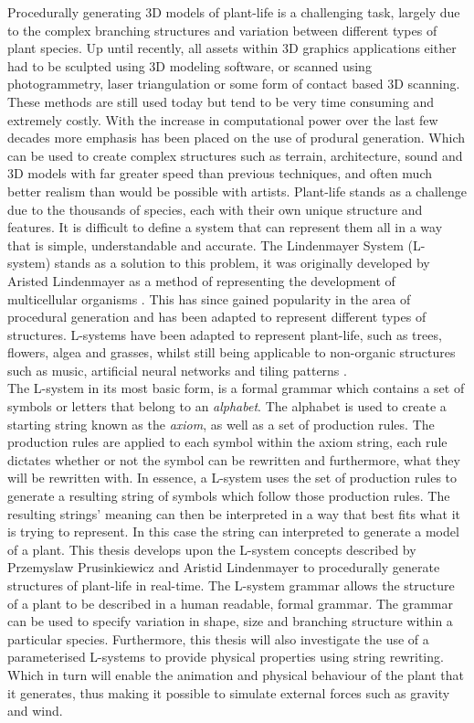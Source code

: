 
\lettrine[lines=3]{P}{}rocedurally generating 3D models of plant-life is a challenging task, largely due to the complex branching structures and variation between different types of plant species. Up until recently, all assets within 3D graphics applications either had to be sculpted using 3D modeling software, or scanned using photogrammetry, laser triangulation or some form of contact based 3D scanning. These methods are still used today but tend to be very time consuming and extremely costly. With the increase in computational power over the last few decades more emphasis has been placed on the use of produral generation. Which can be used to create complex structures such as terrain, architecture, sound and 3D models with far greater speed than previous techniques, and often much better realism than would be possible with artists. Plant-life stands as a challenge due to the thousands of species, each with their own unique structure and features. It is difficult to define a system that can represent them all in a way that is simple, understandable and accurate. The Lindenmayer System (L-system) stands as a solution to this problem, it was originally developed by Aristed Lindenmayer as a method of representing the development of multicellular organisms \cite{lindenmayer1968mathematical}. This has since gained popularity in the area of procedural generation and has been adapted to represent different types of structures. L-systems have been adapted to represent plant-life, such as trees, flowers, algea and grasses, whilst still being applicable to non-organic structures such as music, artificial neural networks and tiling patterns \cite{Prusinkiewicz1989}.\\
 
The L-system in its most basic form, is a formal grammar which contains a set of symbols or letters that belong to an \textit{alphabet}. The alphabet is used to create a starting string known as the \textit{axiom}, as well as a set of production rules. The production rules are applied to each symbol within the axiom string, each rule dictates whether or not the symbol can be rewritten and furthermore, what they will be rewritten with. In essence, a L-system uses the set of production rules to generate a resulting string of symbols which follow those production rules. The resulting strings' meaning can then be interpreted in a way that best fits what it is trying to represent. In this case the string can interpreted to generate a model of a plant. This thesis develops upon the L-system concepts described by Przemyslaw Prusinkiewicz and Aristid Lindenmayer to procedurally generate structures of plant-life in real-time. The L-system grammar allows the structure of a plant to be described in a human readable, formal grammar. The grammar can be used to specify variation in shape, size and branching structure within a particular species. Furthermore, this thesis will also investigate the use of a parameterised L-systems to provide physical properties using string rewriting. Which in turn will enable the animation and physical behaviour of the plant that it generates, thus making it possible to simulate external forces such as gravity and wind. \\

